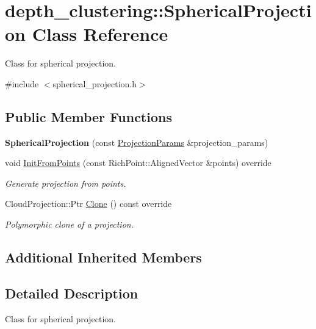 \hypertarget{classdepth__clustering_1_1SphericalProjection}{}\section{depth\+\_\+clustering\+:\+:Spherical\+Projection Class Reference}
\label{classdepth__clustering_1_1SphericalProjection}


Class for spherical projection.  




{\ttfamily \#include $<$spherical\+\_\+projection.\+h$>$}

\subsection*{Public Member Functions}
\begin{DoxyCompactItemize}
\item 
\mbox{\label{classdepth__clustering_1_1SphericalProjection_a75afccfd4b59cfc1291f6475faf25e30}} 
{\bfseries Spherical\+Projection} (const \hyperlink{classdepth__clustering_1_1ProjectionParams}{Projection\+Params} \&projection\+\_\+params)
\item 
void \hyperlink{classdepth__clustering_1_1SphericalProjection_ab80cb1d72f60e7a887affa0ab10ebc03}{Init\+From\+Points} (const Rich\+Point\+::\+Aligned\+Vector \&points) override
\begin{DoxyCompactList}\small\item\em Generate projection from points. \end{DoxyCompactList}\item 
Cloud\+Projection\+::\+Ptr \hyperlink{classdepth__clustering_1_1SphericalProjection_a1b7870502497310666b2909701906470}{Clone} () const override
\begin{DoxyCompactList}\small\item\em Polymorphic clone of a projection. \end{DoxyCompactList}\end{DoxyCompactItemize}
\subsection*{Additional Inherited Members}


\subsection{Detailed Description}
Class for spherical projection. 

